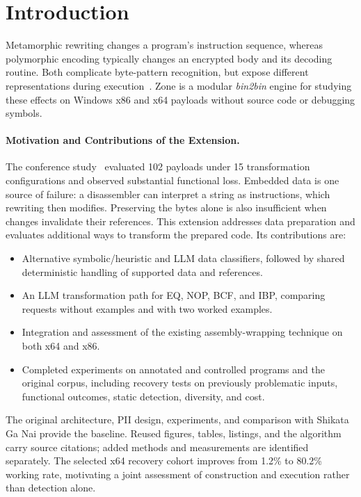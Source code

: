 \documentclass[runningheads]{llncs}
\begin{document}
\section{Introduction}\label{sec:introduction}
Metamorphic rewriting changes a program's instruction sequence, whereas
polymorphic encoding typically changes an encrypted body and its decoding
routine. Both complicate byte-pattern recognition, but expose different
representations during execution~\cite{PEsurveybible,metamorphic1,metamorphic2}.
Zone is a modular \emph{bin2bin} engine for studying these effects on
Windows x86 and x64 payloads without source code or debugging symbols.

\paragraph{Motivation and Contributions of the Extension.}
The conference study~\cite{zone_secrypt_2026} evaluated 102 payloads under
15 transformation configurations and observed substantial functional loss.
Embedded data is one source of failure: a disassembler can interpret a
string as instructions, which rewriting then modifies. Preserving the
bytes alone is also insufficient when changes invalidate their references.
This extension addresses data preparation and evaluates additional ways
to transform the prepared code. Its contributions are:
\begin{itemize}
\item Alternative symbolic/heuristic and LLM data classifiers, followed by
shared deterministic handling of supported data and references.
\item An LLM transformation path for EQ, NOP, BCF, and IBP, comparing
requests without examples and with two worked examples.
\item Integration and assessment of the existing assembly-wrapping
technique on both x64 and x86.
\item Completed experiments on annotated and controlled programs and the
original corpus, including recovery tests on previously problematic
inputs, functional outcomes, static detection, diversity, and cost.
\end{itemize}

The original architecture, PII design, experiments, and comparison with
Shikata Ga Nai provide the baseline. Reused figures, tables, listings, and
the algorithm carry source citations; added methods and measurements are
identified separately. The selected x64 recovery cohort improves from
1.2\% to 80.2\% working rate, motivating a joint assessment of construction
and execution rather than detection alone.
\end{document}
